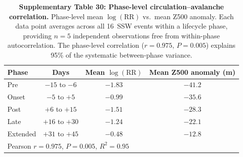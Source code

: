 \documentclass[11pt,letterpaper]{article}
\begin{document}
\begin{table}[!ht]
\centering
\caption{\textbf{Supplementary Table 30: Phase-level circulation--avalanche correlation.}
Phase-level mean $\log(\mathrm{RR})$ vs.\ mean Z500 anomaly. Each data point averages across all 16~SSW events within a lifecycle phase, providing $n = 5$ independent observations free from within-phase autocorrelation. The phase-level correlation ($r = 0.975$, $P = 0.005$) explains 95\% of the systematic between-phase variance.}
\label{tab:phase_correlation}
\small
\begin{tabular}{lccc}
\toprule
Phase & Days & Mean $\log(\mathrm{RR})$ & Mean Z500 anomaly (m) \\
\midrule
Pre & $-15$ to $-6$ & $-1.83$ & $-41.2$ \\
Onset & $-5$ to $+5$ & $-0.99$ & $-35.6$ \\
Post & $+6$ to $+15$ & $-1.51$ & $-28.3$ \\
Late & $+16$ to $+30$ & $-1.24$ & $-22.1$ \\
Extended & $+31$ to $+45$ & $-0.48$ & $-12.8$ \\
\midrule
\multicolumn{4}{l}{Pearson $r = 0.975$, $P = 0.005$, $R^2 = 0.95$} \\
\bottomrule
\end{tabular}
\end{table}
\end{document}
